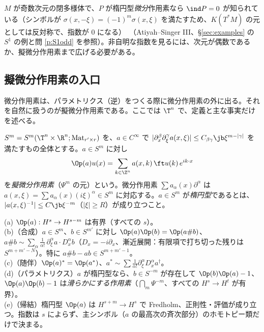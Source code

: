\begin{rem}[奇数次元]
$M$ が奇数次元の閉多様体で、$P$ が楕円型\emph{微分}作用素なら $\ind P=0$ が知られている（シンボルが $\sigma(x,-\xi)=(-1)^m\sigma(x,\xi)$ を満たすため、$K(T^*M)$ の元としては反対称で、指数が $0$ になる）\tC\ （Atiyah--Singer III、\S\ref{sec:examples} の $S^1$ の例と問 \ref{p:S1odd} を参照）。非自明な指数を見るには、次元が偶数であるか、擬微分作用素まで広げる必要がある。
\end{rem}

\subsection{擬微分作用素の入口}\label{sec:psido}
微分作用素は、パラメトリクス（逆）をつくる際に微分作用素の外に出る。それを自然に扱うのが擬微分作用素である。ここでは $\T^n$ で、定義と主な事実だけを述べる。
\begin{defn}[シンボルと擬微分作用素]
$S^m=S^m(\T^n\times\R^n;\mathrm{Mat}_{r'\times r})$ を、$a\in C^\infty$ で $|\partial_x^\beta\partial_\xi^\gamma a(x,\xi)|\le C_{\beta\gamma}\jb\xi^{m-|\gamma|}$ を満たすもの全体とする。$a\in S^m$ に対し
\[
\Op(a)u(x)=\sum_{k\in\Z^n}a(x,k)\,\ft u(k)\,e^{ik\cdot x}
\]
を\emph{擬微分作用素}（$\Psi^m$ の元）という。微分作用素 $\sum a_\alpha(x)\partial^\alpha$ は $a(x,\xi)=\sum a_\alpha(x)(i\xi)^\alpha\in S^m$ に対応する。$a\in S^m$ が\emph{楕円型}であるとは、$|a(x,\xi)^{-1}|\le C\jb\xi^{-m}$（$|\xi|\ge R$）が成り立つこと。
\end{defn}
\begin{thm}[擬微分作用素の基本事実]\label{thm:psido}\tC
(a) $\Op(a):H^s\to H^{s-m}$ は有界（すべての $s$）。\\
(b)（合成）$a\in S^m$、$b\in S^{m'}$ に対し $\Op(a)\Op(b)=\Op(a\#b)$、$a\#b\sim\sum_{\alpha}\frac1{\alpha!}\,\partial_\xi^\alpha a\cdot D_x^\alpha b$（$D_x=-i\partial_x$、漸近展開：有限項で打ち切った残りは $S^{m+m'-N}$）。特に $a\#b-ab\in S^{m+m'-1}$。\\
(c)（随伴）$\Op(a)^*=\Op(a^*)$、$a^*\sim\sum\frac1{\alpha!}\partial_\xi^\alpha D_x^\alpha a^\dagger$。\\
(d)（パラメトリクス）$a$ が楕円型なら、$b\in S^{-m}$ が存在して $\Op(b)\Op(a)-1$、$\Op(a)\Op(b)-1$ は\emph{滑らかにする作用素}（$\bigcap_m\Psi^{-m}$、すべての $H^s\to H^t$ が有界）。\\
(e)（帰結）楕円型 $\Op(a)$ は $H^{s+m}\to H^s$ で Fredholm、正則性・評価が成り立つ。指数は $s$ によらず、主シンボル（$a$ の最高次の斉次部分）のホモトピー類だけで決まる。
\end{thm}
